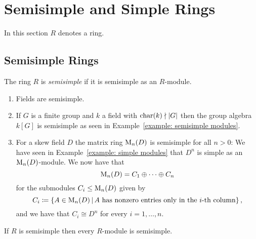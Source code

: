 \section{Semisimple and Simple Rings}


\begin{conventions}
  In this section $R$ denotes a ring.
\end{conventions}





\subsection{Semisimple Rings}


\begin{definition}
  The ring $R$ is \emph{semisimple} if it is semisimple as an $R$-module.
\end{definition}




\begin{example}
  \label{example: semisimple rings}
  \leavevmode
  \begin{enumerate}
    \item
      Fields are semisimple.
    \item
      If $G$ is a finite group and $k$ a field with $\operatorname{char}(k) \nmid |G|$ then the group algebra $k[G]$ is semisimple as seen in Example~\ref{example: semisimple modules}.
    \item
      For a skew field $D$ the matrix ring $\operatorname{M}_n(D)$ is semisimple for all $n > 0$:
      We have seen in Example~\ref{example: simple modules} that $D^n$ is simple as an $\operatorname{M}_n(D)$-module.
      We now have that
      \[
          \operatorname{M}_n(D)
        = C_1 \oplus \dotsb \oplus C_n
      \]
      for the submodules $C_i \leq \operatorname{M}_n(D)$ given by 
      \[
                  C_i
        \defined  \{
                    A \in \Mat_n(D)
                  \suchthat
                    \text{$A$ has nonzero entries only in the $i$-th column}
                  \} \,,
      \]
      and we have that $C_i \cong D^n$ for every $i = 1, \dotsc, n$.
  \end{enumerate}
\end{example}


\begin{proposition}
  If $R$ is semisimple then every $R$-module is semisimple.
\end{proposition}


